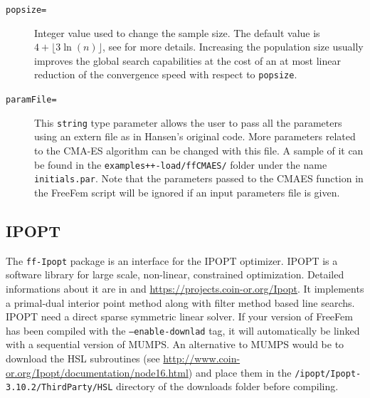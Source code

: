 \documentclass[a4paper,twoside,12pt]{book}
\begin{document}
\begin{description}
    \item[\texttt{popsize=}]  Integer value used to change the sample size. The default value is $4+ \lfloor 3\ln (n) \rfloor$, see \cite{hansen}
    for more details. Increasing the population size usually improves the global search capabilities at the cost of an at most linear reduction of the convergence speed with respect to {\tt popsize}.
    
    \item[\texttt{paramFile=}] This {\tt string} type parameter allows the user to pass all the parameters using an extern file as in Hansen's original code. More parameters related to the CMA-ES algorithm 
    can be changed with this file. A sample of it can be found in the {\tt examples++-load/ffCMAES/} folder under the name {\tt initials.par}. Note that the parameters passed to the CMAES function in the 
    FreeFem script will be ignored if an input parameters file is given.
                 
\end{description}


\subsection{IPOPT}
The {\tt ff-Ipopt} package is an interface for the IPOPT \cite{ipopt} optimizer. IPOPT is a software library for large scale, non-linear, constrained optimization. Detailed informations about it are in \cite{ipopt} and \url{https://projects.coin-or.org/Ipopt}. It implements a primal-dual interior point method along with filter method based line searchs. 
IPOPT need a direct sparse symmetric linear solver. If your version of FreeFem has been compiled with the {\tt --enable-downlad} tag, it will automatically be linked with a sequential version of MUMPS. An alternative to MUMPS would be to download the HSL subroutines (see \url{http://www.coin-or.org/Ipopt/documentation/node16.html}) and place them in the {\tt /ipopt/Ipopt-3.10.2/ThirdParty/HSL} directory of the \freefempp downloads folder before compiling.
\end{document}
